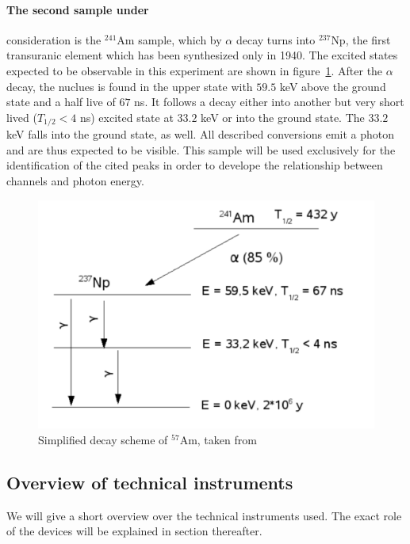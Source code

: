 \paragraph{The second sample under}
consideration is the $^{241}$Am sample, which by $\alpha$ decay turns into $^{237}$Np, the 
first transuranic element which has been synthesized only in 1940. The excited 
states expected to be observable in this experiment are shown in figure~\ref{fig:decay_scheme_Am}. 
After the $\alpha$ decay, the nuclues is found in the upper state with $59.5$ keV 
above the ground state and a half live of $67$ ns. It follows a decay either into another 
but very short lived ($T_{1/2} < 4$ ns) excited state at $33.2$ keV or into the 
ground state. The $33.2$ keV falls into the ground state, as well. All described conversions 
emit a photon and are thus expected to be visible. This sample will be used exclusively for the 
identification of the cited peaks in order to develope the relationship between channels and 
photon energy. 
\begin{figure}
    \begin{centering}
        \includegraphics[width=0.70\linewidth]{figures/decay_scheme_Am}
        \caption{Simplified decay scheme of $^{57}$Am, taken from~\cite{ver}}
        \label{fig:decay_scheme_Am}
    \end{centering}
\end{figure}


\subsection{Overview of technical instruments}
We will give a short overview over the technical instruments used. The exact role 
of the devices will be explained in section thereafter.
\label{sub:overview_of_technical_instruments}
